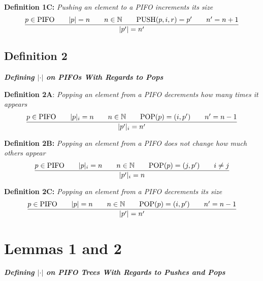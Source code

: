 \documentclass{article}
\begin{document}
\noindent \textbf{Definition 1C:} \textit{Pushing an element to a PIFO increments its size}
$$\frac{p \in \text{PIFO}  \hspace{0.7cm} |p| = n \hspace{0.7cm} n \in \mathbb{N} \hspace{0.7cm} \text{PUSH}(p, i, r) = p' \hspace{0.7cm} n' = n+1}{|p'| = n'}$$\newline

\subsection{Definition 2}
\noindent \textbf{\textit{Defining $|\cdot|$ on PIFOs With Regards to Pops}}

\hfill\break

\noindent \textbf{Definition 2A}: \textit{Popping an element from a PIFO decrements how many times it appears}
 $$\frac{p \in \text{PIFO}  \hspace{0.7cm} |p|_i = n \hspace{0.7cm} n \in \mathbb{N} \hspace{0.7cm} \text{POP}(p) = (i, p') \hspace{0.7cm} n' = n-1}{|p'|_i = n'}$$

\noindent \textbf{Definition 2B:} \textit{Popping an element from a PIFO does not change how much others appear}
$$\frac{p \in \text{PIFO}  \hspace{0.7cm} |p|_i = n \hspace{0.7cm} n \in \mathbb{N} \hspace{0.7cm} \text{POP}(p) = (j, p') \hspace{0.7cm} i \neq j}{|p'|_i = n}$$

\noindent \textbf{Definition 2C:} \textit{Popping an element from a PIFO decrements its size}
$$\frac{p \in \text{PIFO}  \hspace{0.7cm} |p| = n \hspace{0.7cm} n \in \mathbb{N} \hspace{0.7cm} \text{POP}(p) = (i, p') \hspace{0.7cm} n' = n-1}{|p'| = n'}$$\newpage

\section{Lemmas 1 and 2}
\noindent \textbf{\textit{Defining $|\cdot|$ on PIFO Trees With Regards to Pushes and Pops}}\newline
\end{document}
